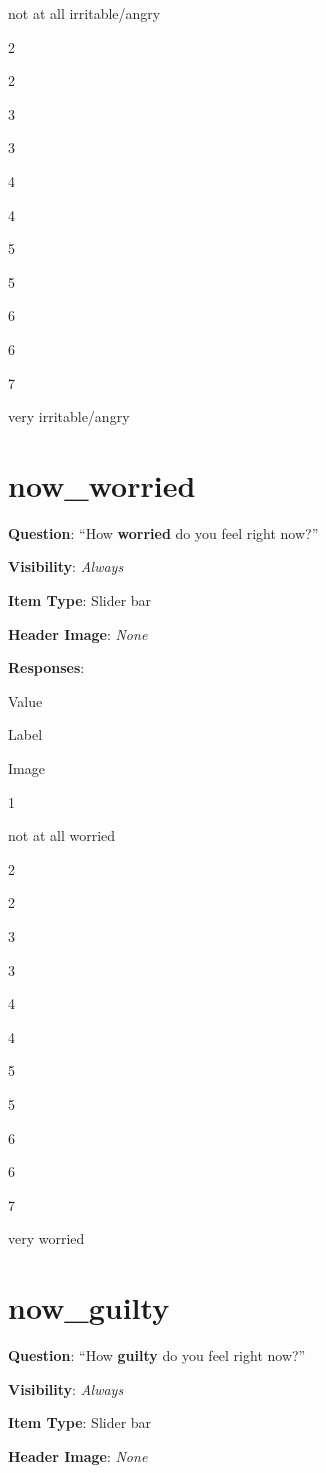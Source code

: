 \documentclass[]{book}
\begin{document}
not at all irritable/angry

2

2

3

3

4

4

5

5

6

6

7

very irritable/angry

\hypertarget{now_worried}{%
\section{now\_worried}\label{now_worried}}

\textbf{Question}: ``How \textbf{worried} do you feel right now?''

\textbf{Visibility}: \emph{Always}

\textbf{Item Type}: Slider bar

\textbf{Header Image}: \emph{None}

\textbf{Responses}:

Value

Label

Image

1

not at all worried

2

2

3

3

4

4

5

5

6

6

7

very worried

\hypertarget{now_guilty}{%
\section{now\_guilty}\label{now_guilty}}

\textbf{Question}: ``How \textbf{guilty} do you feel right now?''

\textbf{Visibility}: \emph{Always}

\textbf{Item Type}: Slider bar

\textbf{Header Image}: \emph{None}
\end{document}
